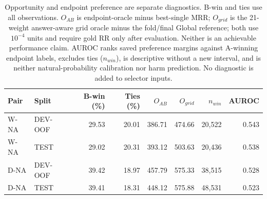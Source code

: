\begin{table}[htbp]
\centering\footnotesize\setlength{\tabcolsep}{3pt}
\caption{Opportunity and endpoint preference are separate diagnostics. B-win and ties use all observations. $O_{AB}$ is endpoint-oracle minus best-single MRR; $O_{grid}$ is the 21-weight answer-aware grid oracle minus the fold/final Global reference; both use $10^{-4}$ units and require gold RR only after evaluation. Neither is an achievable performance claim. AUROC ranks saved preference margins against A-winning endpoint labels, excludes ties ($n_{win}$), is descriptive without a new interval, and is neither natural-probability calibration nor harm prediction. No diagnostic is added to selector inputs.}
\label{tab:scope-opportunity}
\begin{tabular}{llrrrrrr}
\toprule
Pair & Split & B-win (\%) & Ties (\%) & $O_{AB}$ & $O_{grid}$ & $n_{win}$ & AUROC\\
\midrule
W-NA & DEV-OOF & 29.53 & 20.01 & 386.71 & 474.66 & 20,522 & 0.543\\
W-NA & TEST & 29.02 & 20.31 & 393.12 & 503.63 & 20,436 & 0.538\\
D-NA & DEV-OOF & 39.42 & 18.97 & 457.79 & 575.33 & 38,515 & 0.528\\
D-NA & TEST & 39.41 & 18.31 & 448.12 & 575.88 & 48,531 & 0.523\\
\bottomrule
\end{tabular}
\end{table}
